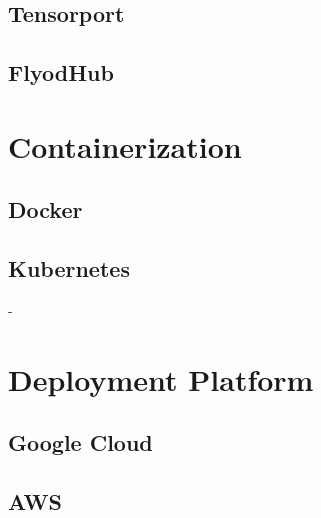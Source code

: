 \subsection{Tensorport}
\subsection{FlyodHub}


\section{Containerization}
\subsection{Docker}
\subsection{Kubernetes}
 -

\section{Deployment Platform}

\subsection{Google Cloud}
\subsection{AWS}


